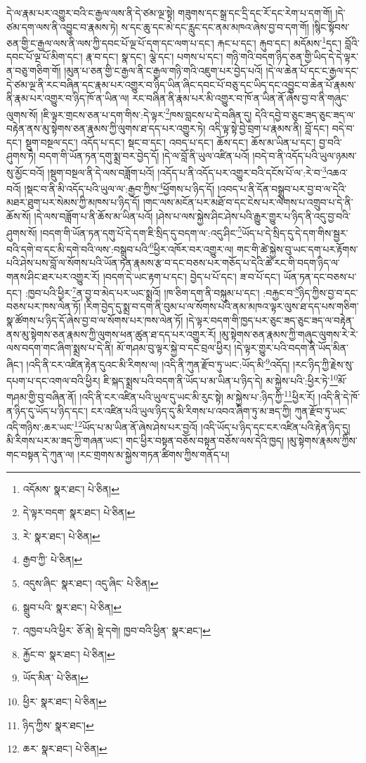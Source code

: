 དེ་ལ་རྣམ་པར་འགྱུར་བའི་ང་རྒྱལ་ལས་ནི་དེ་ཙམ་ལྔ་སྟེ། གཟུགས་དང་སྒྲ་དང་དྲི་དང་རོ་དང་རེག་པ་དག་གོ། །དེ་ཙམ་དག་ལས་ནི་འབྱུང་བ་རྣམས་ཏེ། ས་དང་ཆུ་དང་མེ་དང་རླུང་དང་ནམ་མཁའ་ཞེས་བྱ་བ་དག་གོ། །སྙིང་སྟོབས་ཅན་གྱི་ང་རྒྱལ་ལས་ནི་ལས་ཀྱི་དབང་པོ་ལྔ་པོ་དག་དང་ལག་པ་དང་། རྐང་པ་དང་། རྐུབ་དང་། མདོམས་\footnote{འདོམས་  སྣར་ཐང་།  པེ་ཅིན། }དང་། བློའི་དབང་པོ་ལྔ་པོ་མིག་དང་། རྣ་བ་དང་། སྣ་དང་། ལྕེ་དང་། པགས་པ་དང་། གཉི་གའི་བདག་ཉིད་ཅན་གྱི་ཡིད་དེ་དེ་ལྟར་ན་བཅུ་གཅིག་གོ། །མུན་པ་ཅན་གྱི་ང་རྒྱལ་ནི་ང་རྒྱལ་གཉི་གའི་འཇུག་པར་བྱེད་པའོ། །དེ་ལ་ཆེན་པོ་དང་ང་རྒྱལ་དང་དེ་ཙམ་ལྔ་ནི་རང་བཞིན་དང་རྣམ་པར་འགྱུར་བ་ཉིད་ཡིན་ཞིང་དབང་པོ་བཅུ་དང་ཡིད་དང་འབྱུང་བ་ཆེན་པོ་རྣམས་ནི་རྣམ་པར་འགྱུར་བ་ཉིད་ཁོ་ན་ཡིན་ལ། རང་བཞིན་ནི་རྣམ་པར་མི་འགྱུར་བ་ཁོ་ན་ཡིན་ནོ་ཞེས་བྱ་བ་ནི་གཞུང་ལུགས་སོ། །ཇི་ལྟར་གྲངས་ཅན་པ་དག་གིས་:དེ་ལྟར་\footnote{དེ་ལྟར་བདག་  སྣར་ཐང་།  པེ་ཅིན། }ཁས་བླངས་པ་དེ་བཞིན་དུ། དེའི་དབྱེ་བ་ཅུང་ཟད་ཅུང་ཟད་ལ་བརྟེན་ནས་མུ་སྟེགས་ཅན་རྣམས་ཀྱི་ལུགས་ཐ་དད་པར་འགྱུར་ཏེ། འདི་ལྟ་སྟེ་བྱེ་བྲག་པ་རྣམས་ནི། བློ་དང་། བདེ་བ་དང་། སྡུག་བསྔལ་དང་། འདོད་པ་དང་། སྡང་བ་དང་། འབད་པ་དང་། ཆོས་དང་། ཆོས་མ་ཡིན་པ་དང་། བྱ་བའི་ཤུགས་ཏེ། བདག་གི་ཡོན་ཏན་དགུ་སྨྲ་བར་བྱེད་དོ། །དེ་ལ་བློ་ནི་ཡུལ་འཛིན་པའོ། །བདེ་བ་ནི་འདོད་པའི་ཡུལ་ཉམས་སུ་མྱོང་བའོ། །སྡུག་བསྔལ་ནི་དེ་ལས་བཟློག་པའོ། །འདོད་པ་ནི་འདོད་པར་འགྱུར་བའི་དངོས་པོ་ལ་:རེ་བ་\footnote{རེ་  སྣར་ཐང་།  པེ་ཅིན། }འཆའ་བའོ། །སྡང་བ་ནི་མི་འདོད་པའི་ཡུལ་ལ་:རྒྱབ་ཀྱིས་\footnote{རྒྱབ་ཀྱི་  པེ་ཅིན། }ཕྱོགས་པ་ཉིད་དོ། །འབད་པ་ནི་དོན་བསྒྲུབ་པར་བྱ་བ་ལ་དེའི་མཐར་ཐུག་པར་སེམས་ཀྱི་མཁས་པ་ཉིད་དོ། །གང་ལས་མངོན་པར་མཐོ་བ་དང་ངེས་པར་ལེགས་པ་འགྲུབ་པ་དེ་ནི་ཆོས་སོ། །དེ་ལས་བཟློག་པ་ནི་ཆོས་མ་ཡིན་པའོ། །ཤེས་པ་ལས་སྐྱེས་ཤིང་ཤེས་པའི་རྒྱུར་གྱུར་པ་ཉིད་ནི་འདུ་བྱ་བའི་ཤུགས་སོ། །བདག་གི་ཡོན་ཏན་དགུ་པོ་དེ་དག་ཇི་སྲིད་དུ་བདག་ལ་:འདུ་ཤིང་\footnote{འདུས་ཞིང་  སྣར་ཐང་། འདུ་ཞིང་  པེ་ཅིན། }ཡོད་པ་དེ་སྲིད་དུ་དེ་དག་གིས་སྦྱར་བའི་དགེ་བ་དང་མི་དགེ་བའི་ལས་:བསྒྲུབ་པའི་\footnote{སྒྲུབ་པའི་  སྣར་ཐང་།  པེ་ཅིན། }ཕྱིར་འཁོར་བར་འགྱུར་ལ། གང་གི་ཚེ་སྐྱེས་བུ་ཡང་དག་པར་རྟོགས་པའི་ཤེས་པས་བློ་ལ་སོགས་པའི་ཡོན་ཏན་རྣམས་རྩ་བ་དང་བཅས་པར་གཅོད་པ་དེའི་ཚེ་རང་གི་བདག་ཉིད་ལ་གནས་ཤིང་ཐར་པར་འགྱུར་རོ། །བདག་དེ་ཡང་རྟག་པ་དང་། བྱེད་པ་པོ་དང་། ཟ་བ་པོ་དང་། ཡོན་ཏན་དང་བཅས་པ་དང་། :ཁྱབ་པའི་ཕྱིར་\footnote{འཁྱབ་པའི་ཕྱིར་  ཅོ་ནེ།  སྡེ་དགེ། ཁྱབ་བའི་ཕྱིན་  སྣར་ཐང་། }ན་བྱ་བ་མེད་པར་ཡང་སྨྲའོ། །ཁ་ཅིག་དག་ནི་བསྐུམ་པ་དང་། :བརྐྱང་བ་\footnote{རྐྱོང་བ་  སྣར་ཐང་།  པེ་ཅིན། }ཉིད་ཀྱིས་བྱ་བ་དང་བཅས་པར་ཁས་ལེན་ཏོ། །རིག་བྱེད་དུ་སྨྲ་བ་དག་ནི་བུམ་པ་ལ་སོགས་པའི་ནམ་མཁའ་ལྟར་ལུས་ཐ་དད་པས་གཅིག་སྣ་ཚོགས་པ་ཉིད་དོ་ཞེས་བྱ་བ་ལ་སོགས་པར་ཁས་ལེན་ཏོ། །དེ་ལྟར་བདག་གི་ཁྱད་པར་ཅུང་ཟད་ཅུང་ཟད་ལ་བརྟེན་ནས་མུ་སྟེགས་ཅན་རྣམས་ཀྱི་ལུགས་ཕན་ཚུན་ཐ་དད་པར་འགྱུར་རོ། །མུ་སྟེགས་ཅན་རྣམས་ཀྱི་གཞུང་ལུགས་རེ་རེ་ལས་བདག་གང་ཞིག་སྨྲས་པ་དེ་ནི། མོ་གཤམ་བུ་ལྟར་སྐྱེ་བ་དང་བྲལ་ཕྱིར། །དེ་ལྟར་གྱུར་པའི་བདག་ནི་ཡོད་མིན་ཞིང་། །འདི་ནི་ངར་འཛིན་རྟེན་དུའང་མི་རིགས་ལ། །འདི་ནི་ཀུན་རྫོབ་ཏུ་ཡང་:ཡོད་མི་\footnote{ཡོད་མིན་  པེ་ཅིན། }འདོད། །རང་ཉིད་ཀྱི་རྗེས་སུ་དཔག་པ་དང་འགལ་བའི་ཕྱིར། ཇི་སྐད་སྨྲས་པའི་བདག་ནི་ཡོད་པ་མ་ཡིན་པ་ཉིད་དེ། མ་སྐྱེས་པའི་:ཕྱིར་ཏེ་\footnote{ཕྱིར་  སྣར་ཐང་།  པེ་ཅིན། }མོ་གཤམ་གྱི་བུ་བཞིན་ནོ། །འདི་ནི་ངར་འཛིན་པའི་ཡུལ་དུ་ཡང་མི་རུང་སྟེ། མ་སྐྱེས་པ་:ཉིད་ཀྱི་\footnote{ཉིད་ཀྱིས་  སྣར་ཐང་། }ཕྱིར་རོ། །འདི་ནི་དེ་ཁོ་ན་ཉིད་དུ་ཡོད་པ་ཉིད་དང་། ངར་འཛིན་པའི་ཡུལ་ཉིད་དུ་མི་རིགས་པ་འབའ་ཞིག་ཏུ་མ་ཟད་ཀྱི། ཀུན་རྫོབ་ཏུ་ཡང་འདི་གཉིས་:ཆར་ཡང་\footnote{ཆར་  སྣར་ཐང་།  པེ་ཅིན། }ཡོད་པ་མ་ཡིན་ནོ་ཞེས་ཤེས་པར་བྱའོ། །འདི་ཡོད་པ་ཉིད་དང་ངར་འཛིན་པའི་རྟེན་ཉིད་དུ། མི་རིགས་པར་མ་ཟད་ཀྱི་གཞན་ཡང་། གང་ཕྱིར་བསྟན་བཅོས་བསྟན་བཅོས་ལས་དེའི་ཁྱད། །མུ་སྟེགས་རྣམས་ཀྱིས་གང་བསྟན་དེ་ཀུན་ལ། །རང་གྲགས་མ་སྐྱེས་གཏན་ཚིགས་ཀྱིས་གནོད་པ། 